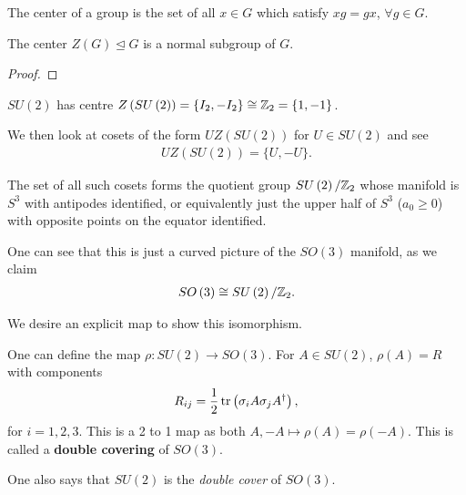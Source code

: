 
\begin{definition}
    The center of a group is the set of all $x \in G$ which satisfy $x g = g x$, $\forall g \in G$.
\end{definition}

\begin{theorem}
    The center $Z \left( G \right) \trianglelefteq G $  is a normal subgroup of $G$.
\end{theorem}

\begin{proof}
    
\end{proof}

$SU \left( 2 \right) $ has centre $Z \left( SU \left( 2 \right)  \right) = \{I_2, -I_2\} \cong \mathbb{Z}_2 = \{1,-1\} $.

We then look at cosets of the form $U Z \left( SU \left( 2 \right)  \right) $ for $U \in SU \left( 2 \right) $ and see
\begin{align}
    U Z \left( SU \left( 2 \right)  \right) = \{U, - U\} 
.\end{align}

The set of all such cosets forms the quotient group $SU \left( 2 \right)  / \mathbb{Z}_2$ whose manifold is $S^{3}$ with antipodes identified, or equivalently just the upper half of $S^{3}$ ($a_0 \geq 0$) with opposite points on the equator identified.


One can see that this is just a curved picture of the $SO \left( 3 \right) $ manifold, as we claim
\begin{align}
    SO \left( 3 \right) \cong SU \left( 2 \right) / \mathbb{Z}_2
.\end{align}

We desire an explicit map to show this isomorphism.

One can define the map $\rho : SU\left( 2 \right) \to SO \left( 3 \right) $. For $A \in SU \left( 2 \right) $, $\rho \left( A \right) = R$ with components
\begin{align}
    R_{ij} = \frac{1}{2}\tr \left( \sigma_{i} A \sigma_j A^{\dag} \right) 
,\end{align}
for $i = 1,2,3$. This is a 2 to 1 map as both $A,-A \mapsto \rho \left( A \right) = \rho \left( -A \right) $. This is called a \textbf{double covering} of $SO \left( 3 \right) $.

One also says that $SU \left( 2 \right) $ is the \textit{double cover} of $SO \left( 3 \right) $.

